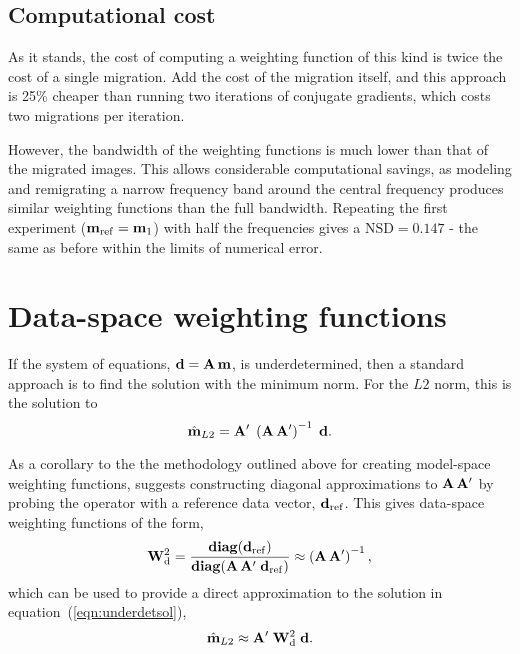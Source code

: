 
\subsection{Computational cost}
As it stands, the cost of computing a weighting function of this kind
is twice the cost of a single migration.  Add the cost of the
migration itself, and this approach is 25\% cheaper than running two
iterations of conjugate gradients, which costs two migrations per
iteration. 

\par
However, the bandwidth of the weighting functions is much lower than
that of the migrated images. This allows considerable
computational savings, as modeling and remigrating a narrow frequency
band around the central frequency produces similar weighting functions
than the full bandwidth.  Repeating the first experiment 
(${\bf m}_{\rm ref}={\bf m}_1$) with half the frequencies gives a
$\mbox{NSD}=0.147$ - the same as before within the limits of numerical
error.  

\section{Data-space weighting functions}
If the system of equations, ${\bf d}={\bf A}\, {\bf m}$,
is underdetermined, then a standard approach is to find the solution with 
the minimum norm.  For the $L2$ norm, this is the solution to 
\begin{equation} \label{eqn:underdetsol}
\hat{\bf m}_{L2} ={\bf A}' \; 
\left(
{\bf A} \, {\bf A}'
\right)^{-1} \;
{\bf d}.
\end{equation}

\par
As a corollary to the the methodology outlined above for creating
model-space weighting functions,  suggests constructing 
diagonal approximations to ${\bf A} \, {\bf A}'$ by probing the
operator with a reference data vector, ${\bf d}_{\rm ref}$. 
This gives data-space weighting functions of the form,
\begin{equation} \label{eqn:wd}
{\bf W}_{\rm d}^{2} = \frac{ {\rm\bf diag} ({\bf d}_{\rm ref}) }
{ {\rm\bf diag} ({\bf A}\, {\bf A}' \; {\bf d}_{\rm ref}) } \approx 
\left( {\bf A}\, {\bf A}' \right)^{-1},
\end{equation}
which can be used to provide a direct approximation to the
solution in equation~(\ref{eqn:underdetsol}),
\begin{equation}
\hat{\bf m}_{L2} \approx {\bf A}' \; 
{\bf W}_{\rm d}^2 \;
{\bf d}.
\end{equation}

